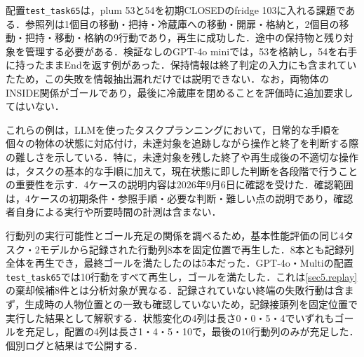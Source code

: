 配置\texttt{test\_task65}は，plum 53と54を初期CLOSEDのfridge 103に入れる課題である．参照列は1個目の移動・把持・冷蔵庫への移動・開扉・格納と，2個目の移動・把持・移動・格納の9行動であり，再生に成功した．途中の保持物と残り対象を管理する必要がある．検証なしのGPT-4o miniでは，53を格納し，54を右手に持ったままEndを返す例があった．保持情報は終了判定の入力にも含まれていたため，この失敗を情報抽出漏れだけでは説明できない．なお，両物体のINSIDE関係がゴールであり，最後に冷蔵庫を閉めることを評価時に追加要求してはいない．

これらの例は，LLMを使ったタスクプランニングにおいて，日常的な手順を個々の物体の状態に対応付け，未達対象を追跡しながら操作と終了を判断する際の難しさを示している．特に，未達対象を残した終了や再生成後の不適切な操作は，タスクの基本的な手順に加えて，現在状態に即した判断を各段階で行うことの重要性を示す．4ケースの説明内容は2026年9月6日に確認を受けた．確認範囲は，4ケースの初期条件・参照手順・必要な判断・難しい点の説明であり，確認者自身による実行や所要時間の計測は含まない．

行動列の実行可能性とゴール充足の関係を調べるため，基本性能評価の同じ4タスク・2モデルから記録された行動列8本を固定位置で再生した．8本とも記録列全体を再生でき，最終ゴールを満たしたのは5本だった．GPT-4o・Multiの配置\texttt{test\_task65}では10行動をすべて再生し，ゴールを満たした．これは\ref{sec5.replay}の棄却候補8件とは分析対象が異なる．記録されていない終端の失敗行動は含まず，生成時の人物位置との一致も確認していないため，記録接頭列を固定位置で実行した結果として解釈する．状態変化の4列は長さ0・0・5・4でいずれもゴールを充足し，配置の4列は長さ1・4・5・10で，最後の10行動列のみが充足した．個別ログと結果はで公開する．
